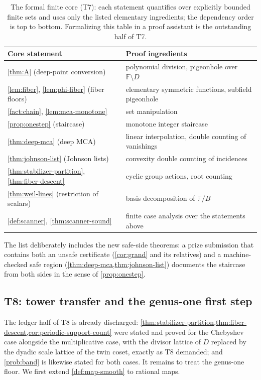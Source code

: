 \documentclass[11pt]{article}
\theoremstyle{definition}
\theoremstyle{remark}
\newcommand{\F}{\mathbb{F}}
\newcommand{\B}{B}
\begin{document}
\begin{table}[ht]
\centering
\small
\begin{tabular}{@{}ll@{}}
\toprule
Core statement & Proof ingredients \\
\midrule
\cref{thm:A} (deep-point conversion) & polynomial division, pigeonhole over $\F\setminus D$ \\
\cref{lem:fiber}, \cref{lem:phi-fiber} (fiber floors) & elementary symmetric functions, subfield pigeonhole \\
\cref{fact:chain}, \cref{lem:mca-monotone} & set manipulation \\
\cref{prop:onestep} (staircase) & monotone integer staircase \\
\cref{thm:deep-mca} (deep MCA) & linear interpolation, double counting of vanishings \\
\cref{thm:johnson-list} (Johnson lists) & convexity double counting of incidences \\
\cref{thm:stabilizer-partition}, \cref{thm:fiber-descent} & cyclic group actions, root counting \\
\cref{thm:weil-lines} (restriction of scalars) & basis decomposition of $\F/\B$ \\
\cref{def:scanner}, \cref{thm:scanner-sound} & finite case analysis over the statements above \\
\bottomrule
\end{tabular}
\caption{The formal finite core (T7): each statement quantifies over explicitly bounded finite sets and uses only the listed elementary ingredients; the dependency order is top to bottom. Formalizing this table in a proof assistant is the outstanding half of T7.}
\label{tab:core}
\end{table}

The list deliberately includes the new safe-side theorems: a prize submission that contains both an unsafe certificate \textup(\cref{cor:grand} and its relatives\textup) and a machine-checked safe region \textup(\cref{thm:deep-mca,thm:johnson-list}\textup) documents the staircase from both sides in the sense of \cref{prop:onestep}.

\subsection{T8: tower transfer and the genus-one first step}\label{sec:discharge-T8}

The ledger half of T8 is already discharged: \cref{thm:stabilizer-partition,thm:fiber-descent,cor:periodic-support-count} were stated and proved for the Chebyshev case alongside the multiplicative case, with the divisor lattice of $D$ replaced by the dyadic scale lattice of the twin coset, exactly as T8 demanded; and \cref{prob:band} is likewise stated for both cases. It remains to treat the genus-one floor. We first extend \cref{def:map-smooth} to rational maps.
\end{document}
